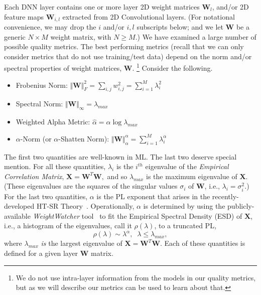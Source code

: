 Each DNN layer contains one or more layer 2D weight matrices $\mathbf{W}_{l}$, and/or 2D feature maps $\mathbf{W}_{i,l}$ extracted from 2D Convolutional layers. 
(For notational convenience, we may drop the $i$ and/or $i,l$ subscripts below; and we let $\mathbf{W}$ be a generic $N\times M$ weight matrix, with $N\ge M$.) 
%
We have examined a large number of possible quality metrics.
The best performing metrics (recall that we can only consider metrics that do not use training/test data) depend on the norm and/or spectral properties of weight matrices, $\mathbf{W}$.%
\footnote{We do not use intra-layer information from the models in our quality metrics, but as we will describe our metrics can be used to learn about that.}
Consider the following.
\begin{itemize}
\item 
Frobenius Norm: $\Vert\mathbf{W}\Vert^{2}_{F}=\sum_{i,j}w^{2}_{i,j} = \sum_{i=1}^{M} \lambda_{i}^{2}$
\item 
Spectral Norm: $\Vert\mathbf{W}\Vert_{\infty}=\lambda_{max}$
\item 
Weighted Alpha Metric: $\hat{\alpha}=\alpha\log\lambda_{max}$
\item 
$\alpha$-Norm (or $\alpha$-Shatten Norm): $\Vert\mathbf{W}\Vert^{\alpha}_{\alpha}=\sum_{i=1}^{M}\lambda_{i}^{\alpha}$
\end{itemize}
The first two quantities are well-known in ML.
The last two deserve special mention.
For all these quantities, $\lambda_{i}$ is the $i^{th}$ eigenvalue of the \emph{Empirical Correlation Matrix},
$ %
\mathbf{X}=\mathbf{W}^{T}\mathbf{W} ,
$ %
and so $\lambda_{max}$ is the maximum eigenvalue of $\mathbf{X}$. 
(These eigenvalues are the squares of the singular values $\sigma_{i}$ of $\mathbf{W}$, i.e., $\lambda_{i}=\sigma^{2}_{i}$.)
For the last two quantities, $\alpha$ is the PL exponent that arises in the recently-developed HT-SR Theory~\cite{MM18_TR, MM19_HTSR_ICML, MM20_SDM}.
Operationally, $\alpha$ is determined by using the publicly-available \emph{WeightWatcher} tool~\cite{weightwatcher_package} to fit the Empirical Spectral Density (ESD) of $\mathbf{X}$, i.e., a histogram of the eigenvalues, call it $\rho(\lambda)$, to a truncated PL, 
\begin{equation}
\rho(\lambda)\sim\lambda^{\alpha},\;\;\lambda\le\lambda_{max}  ,
\end{equation}
where $\lambda_{max}$ \emph{is} the largest eigenvalue of $\mathbf{X}=\mathbf{W}^{T}\mathbf{W}$.
Each of these quantities is defined for a given layer $\mathbf{W}$ matrix.

